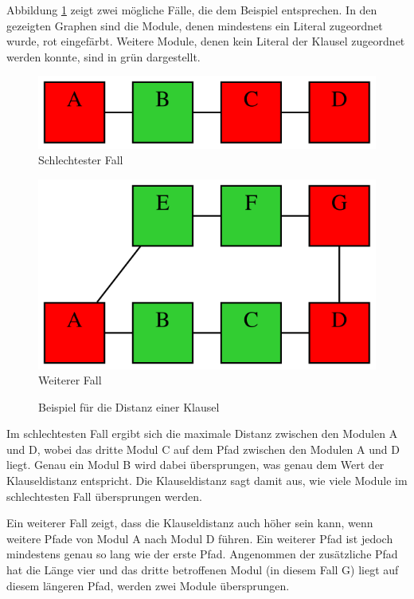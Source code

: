 Abbildung \ref{fig:distance} zeigt zwei mögliche Fälle, die dem Beispiel entsprechen. In den gezeigten Graphen sind die Module, denen mindestens ein Literal
zugeordnet wurde, rot eingefärbt. Weitere Module, denen kein Literal der Klausel zugeordnet werden konnte, sind in grün dargestellt.
\begin{figure}[!h]
  \centering
  \begin{minipage}[b]{6cm}
    \centering
    \includegraphics[scale=0.6]{images/distance1}\\
    Schlechtester Fall
  \end{minipage}
  \begin{minipage}[b]{6cm}
    \centering
    \includegraphics[scale=0.6]{images/distance2}\\
    Weiterer Fall
  \end{minipage}
  \caption{Beispiel für die Distanz einer Klausel}
  \label{fig:distance}
\end{figure}

Im schlechtesten Fall ergibt sich die maximale Distanz zwischen den Modulen A und D, wobei das dritte Modul C auf dem Pfad zwischen den Modulen A und D liegt.
Genau ein Modul B wird dabei übersprungen, was genau dem Wert der Klauseldistanz entspricht. Die Klauseldistanz sagt damit aus, wie viele Module im schlechtesten
Fall übersprungen werden.

Ein weiterer Fall zeigt, dass die Klauseldistanz auch höher sein kann, wenn weitere Pfade von Modul A nach Modul D führen. Ein weiterer Pfad ist jedoch mindestens
genau so lang wie der erste Pfad. Angenommen der zusätzliche Pfad hat die Länge vier und das dritte betroffenen Modul (in diesem Fall G) liegt auf diesem längeren
Pfad, werden zwei Module übersprungen.

